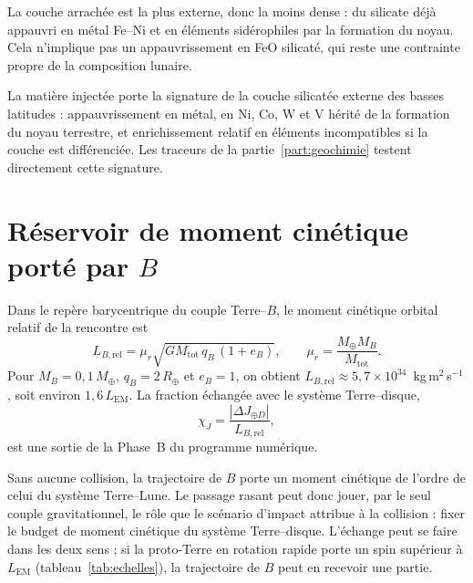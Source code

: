 \documentclass[11pt,a4paper,openany]{report}
\newcommand{\Mt}{M_{\oplus}}
\newcommand{\Rt}{R_{\oplus}}
\newcommand{\Mtot}{M_{\mathrm{tot}}}
\begin{document}
\begin{ideephys}
La couche arrachée est la plus externe, donc la moins dense : du silicate déjà appauvri en
métal Fe--Ni et en éléments sidérophiles par la formation du noyau. Cela n'implique pas un
appauvrissement en FeO silicaté, qui reste une contrainte propre de la composition lunaire.
\end{ideephys}

\begin{consequence}
La matière injectée porte la signature de la couche silicatée externe des basses latitudes :
appauvrissement en métal, en Ni, Co, W et V hérité de la formation du noyau terrestre, et
enrichissement relatif en éléments incompatibles si la couche est différenciée. Les traceurs de la
partie~\ref{part:geochimie} testent directement cette signature.
\end{consequence}

\section{Réservoir de moment cinétique porté par \texorpdfstring{$B$}{B}}

Dans le repère barycentrique du couple Terre--$B$, le moment cinétique orbital relatif de la
rencontre est
\begin{equation}
L_{B,\mathrm{rel}}=\mu_r\sqrt{G\Mtot\,q_B\,(1+e_B)},
\qquad \mu_r=\frac{\Mt M_B}{\Mtot}.
\label{eq:LBrel}
\end{equation}
Pour $M_B=0{,}1\,\Mt$, $q_B=2\,\Rt$ et $e_B=1$, on obtient
$L_{B,\mathrm{rel}}\approx5{,}7\times10^{34}$~kg\,m$^2$\,s$^{-1}$, soit environ $1{,}6\,L_{\mathrm{EM}}$.
La fraction échangée avec le système Terre--disque,
\begin{equation}
\chi_J=\frac{|\Delta J_{\oplus D}|}{L_{B,\mathrm{rel}}},
\label{eq:chiJ}
\end{equation}
est une sortie de la Phase~B du programme numérique.

\begin{apport}
Sans aucune collision, la trajectoire de $B$ porte un moment cinétique de l'ordre de celui du
système Terre--Lune. Le passage rasant peut donc jouer, par le seul couple gravitationnel, le
rôle que le scénario d'impact attribue à la collision : fixer le budget de moment cinétique du
système Terre--disque. L'échange peut se faire dans les deux sens ; si la proto-Terre en rotation
rapide porte un spin supérieur à $L_{\mathrm{EM}}$ (tableau~\ref{tab:echelles}), la trajectoire de $B$
peut en recevoir une partie.
\end{apport}
\end{document}
